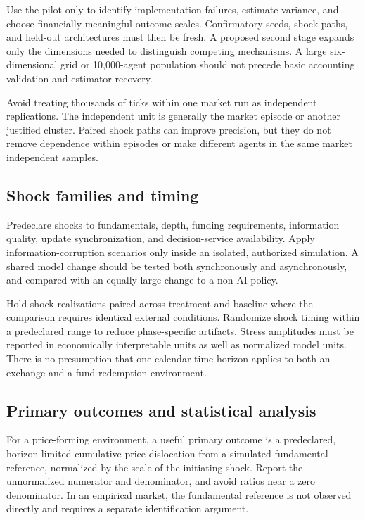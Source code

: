\documentclass[11pt,a4paper]{article}
\theoremstyle{definition}
\theoremstyle{remark}
\begin{document}
Use the pilot only to identify implementation failures, estimate variance, and choose financially meaningful outcome scales. Confirmatory seeds, shock paths, and held-out architectures must then be fresh. A proposed second stage expands only the dimensions needed to distinguish competing mechanisms. A large six-dimensional grid or 10,000-agent population should not precede basic accounting validation and estimator recovery.

Avoid treating thousands of ticks within one market run as independent replications. The independent unit is generally the market episode or another justified cluster. Paired shock paths can improve precision, but they do not remove dependence within episodes or make different agents in the same market independent samples.

\subsection{Shock families and timing}
Predeclare shocks to fundamentals, depth, funding requirements, information quality, update synchronization, and decision-service availability. Apply information-corruption scenarios only inside an isolated, authorized simulation. A shared model change should be tested both synchronously and asynchronously, and compared with an equally large change to a non-AI policy.

Hold shock realizations paired across treatment and baseline where the comparison requires identical external conditions. Randomize shock timing within a predeclared range to reduce phase-specific artifacts. Stress amplitudes must be reported in economically interpretable units as well as normalized model units. There is no presumption that one calendar-time horizon applies to both an exchange and a fund-redemption environment.

\subsection{Primary outcomes and statistical analysis}
For a price-forming environment, a useful primary outcome is a predeclared, horizon-limited cumulative price dislocation from a simulated fundamental reference, normalized by the scale of the initiating shock. Report the unnormalized numerator and denominator, and avoid ratios near a zero denominator. In an empirical market, the fundamental reference is not observed directly and requires a separate identification argument.
\end{document}
